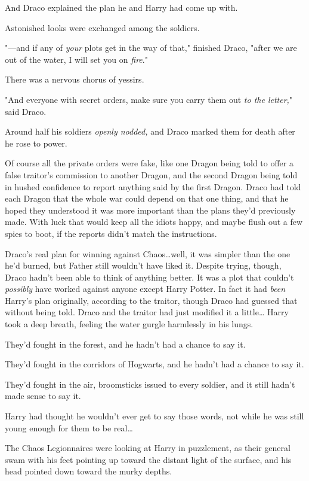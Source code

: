 And Draco explained the plan he and Harry had come up with.

Astonished looks were exchanged among the soldiers.

"---and if any of \emph{your} plots get in the way of that," finished Draco,
"after we are out of the water, I will set you on \emph{fire}."

There was a nervous chorus of yessirs.

"And everyone with secret orders, make sure you carry them out \emph{to the
letter,}" said Draco.

Around half his soldiers \emph{openly nodded,} and Draco marked them for death
after he rose to power.

Of course all the private orders were fake, like one Dragon being told to offer
a false traitor's commission to another Dragon, and the second Dragon being
told in hushed confidence to report anything said by the first Dragon. Draco
had told each Dragon that the whole war could depend on that one thing, and
that he hoped they understood it was more important than the plans they'd
previously made. With luck that would keep all the idiots happy, and maybe
flush out a few spies to boot, if the reports didn't match the instructions.

Draco's real plan for winning against Chaos…well, it was simpler than
the one he'd burned, but Father still wouldn't have liked it. Despite trying,
though, Draco hadn't been able to think of anything better. It was a plot that
couldn't \emph{possibly} have worked against anyone except Harry Potter. In
fact it had \emph{been} Harry's plan originally, according to the traitor,
though Draco had guessed that without being told. Draco and the traitor had
just modified it a little…
\later
Harry took a deep breath, feeling the water gurgle harmlessly in his lungs.

They'd fought in the forest, and he hadn't had a chance to say it.

They'd fought in the corridors of Hogwarts, and he hadn't had a chance to
say it.

They'd fought in the air, broomsticks issued to every soldier, and it still
hadn't made sense to say it.

Harry had thought he wouldn't ever get to say those words, not while he was
still young enough for them to be real…

The Chaos Legionnaires were looking at Harry in puzzlement, as their general
swam with his feet pointing up toward the distant light of the surface, and his
head pointed down toward the murky depths.

